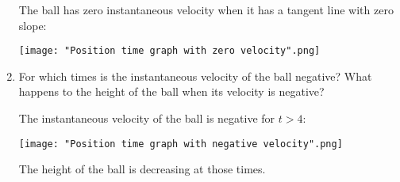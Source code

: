 \documentclass[nooutcomes]{ximera}
\begin{document}
\begin{problem}
\begin{enumerate}
		\begin{freeResponse}		 
		 The ball has zero instantaneous velocity when it has a tangent line with zero slope:
        \begin{image}
          \texttt{[image: "Position time graph with zero velocity".png]}
        \end{image}
		\end{freeResponse}
		
		
		
		\item  For which times is the instantaneous velocity of the ball negative?
      What happens to the height of the ball when its velocity is negative?
      \begin{freeResponse}
        The instantaneous velocity of the ball is negative for $t > 4$:
        \begin{image}
          \texttt{[image: "Position time graph with negative velocity".png]}
        \end{image}
        The height of the ball is decreasing at those times.
      \end{freeResponse}
			
		\end{enumerate}
			
\end{problem}
			
\end{document}

